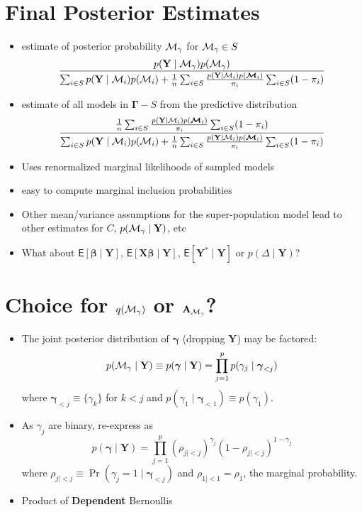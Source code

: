 \documentclass[
]{report}
\newcommand{\E}{\textsf{E}}
\newcommand{\1}{\mathbf{1}_n}
\newcommand{\Y}{\mathbf{Y}}
\def\X{\mathbf{X}}
\newcommand{\A}{\mathbf{A}}
\def\b{\boldsymbol{\beta}}
\def\M{{{\cal M}}}
\def\Mi{\boldsymbol{{\cal M}}_i}
\def\Mg{{\boldsymbol{{\cal M}_\gamma}}}
\def\g{\boldsymbol{\gamma}}
\def\G{\boldsymbol{\Gamma}}
\def\Mg{{\cal M}_\gamma}
\begin{document}
\section{Final Posterior Estimates}\label{final-posterior-estimates}

\begin{itemize}
\item
  estimate of posterior probability \(\Mg\) for \(\Mg \in S\) \[
  \frac{p(\Y \mid \Mg) p(\Mg)}{\sum_{i \in S} p(\Y \mid \M_i) p(\M_i) +  \frac{1}{n} \sum_{i \in S} \frac{p(\Y \mid \M_i) p(\Mi)}{\pi_i}\sum_{i \in S} (1 - \pi_i)}
  \]
\item
  estimate of all models in \(\G - S\) from the predictive distribution
  \[
  \frac{\frac{1}{n} \sum_{i \in S} \frac{p(\Y \mid \M_i) p(\Mi)}{\pi_i}\sum_{i \in S} (1 - \pi_i)}{\sum_{i \in S} p(\Y \mid \M_i) p(\M_i) +  \frac{1}{n} \sum_{i \in S} \frac{p(\Y \mid \M_i) p(\Mi)}{\pi_i}\sum_{i \in S} (1 - \pi_i)}
  \]
\item
  Uses renormalized marginal likelihoods of sampled models
\item
  easy to compute marginal inclusion probabilities
\item
  Other mean/variance assumptions for the super-population model lead to
  other estimates for \(C\), \(p(\Mg \mid \Y)\), etc
\item
  What about \(\E[\b \mid \Y]\), \(\E[\X\b \mid \Y]\),
  \(\E[\Y^* \mid \Y]\) or \(p(\Delta \mid \Y)\)?
\end{itemize}

\section{\texorpdfstring{Choice for \(q(\Mg)\) or
\(\A_{\Mg}\)?}{Choice for q(\textbackslash Mg) or \textbackslash A\_\{\textbackslash Mg\}?}}\label{choice-for-qmg-or-a_mg}

\begin{itemize}
\item
  The joint posterior distribution of \(\g\) (dropping \(\Y\)) may be
  factored:
  \[p(\Mg \mid \Y) \equiv p(\g \mid \Y) = \prod_{j = 1}^p p(\gamma_j \mid \g_{<j})
  \] where \(\g_{< j}\equiv \{\gamma_k\}\) for \(k < j\) and
  \(p(\gamma_1
  \mid \g_{<1}) \equiv p(\gamma_1)\).
\item
  As \(\gamma_j\) are binary, re-express as \begin{equation*}
  p(\g \mid \Y) = \prod_{j=1}^p(\rho_{j \mid <j})^{\gamma_j}{(1-\rho_{j
    \mid <j})}^{1-\gamma_j}
  \end{equation*} where
  \(\rho_{j \mid <j} \equiv \Pr(\gamma_j = 1 \mid \g_{<j})\) and
  \(\rho_{1 \mid < 1} = \rho_1\), the marginal probability.
\item
  Product of \textbf{Dependent} Bernoullis
\end{itemize}
\end{document}
